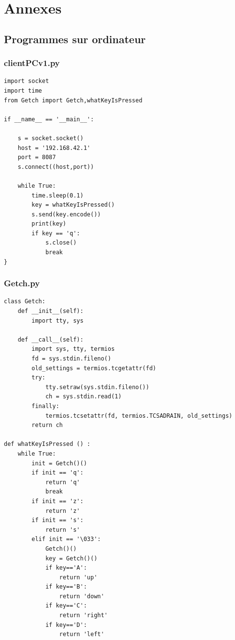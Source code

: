 \documentclass[twoside,twocolumn, 16pt]{article}
\begin{document}
\newpage
\section{Annexes}
\subsection{Programmes sur ordinateur}
\subsubsection{clientPCv1.py}
\begin{lstlisting}
import socket
import time
from Getch import Getch,whatKeyIsPressed

if __name__ == '__main__':
	
	s = socket.socket()
	host = '192.168.42.1'
	port = 8087
	s.connect((host,port))
	
	while True:
		time.sleep(0.1)
		key = whatKeyIsPressed()
		s.send(key.encode())
		print(key)
		if key == 'q':
			s.close()
			break
}
\end{lstlisting}

\subsubsection{Getch.py}

\begin{lstlisting}
class Getch:
	def __init__(self):
		import tty, sys

	def __call__(self):
		import sys, tty, termios
		fd = sys.stdin.fileno()
		old_settings = termios.tcgetattr(fd)
		try:
			tty.setraw(sys.stdin.fileno())
			ch = sys.stdin.read(1)
		finally:
			termios.tcsetattr(fd, termios.TCSADRAIN, old_settings)
		return ch

def whatKeyIsPressed () :
	while True:
		init = Getch()()
		if init == 'q':
			return 'q'
			break
		if init == 'z':
			return 'z'
		if init == 's':
			return 's'
		elif init == '\033':
			Getch()()
			key = Getch()()
			if key=='A':
				return 'up'
			if key=='B':
				return 'down'
			if key=='C':
				return 'right'
			if key=='D':
				return 'left'
\end{lstlisting}
\end{document}
